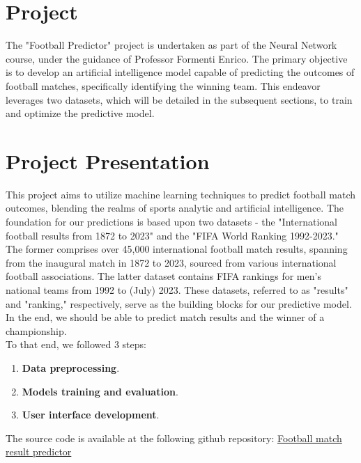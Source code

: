 \documentclass[a4paper,12pt]{article}
\begin{document}
\newpage
\maketitle
\tableofcontents

\newpage
\section{Project}

The "Football Predictor" project is undertaken as part of the Neural Network course, under the guidance of Professor Formenti Enrico. The primary objective is to develop an artificial intelligence model capable of predicting the outcomes of football matches, specifically identifying the winning team. This endeavor leverages two datasets, which will be detailed in the subsequent sections, to train and optimize the predictive model.

\section{Project Presentation}

This project aims to utilize machine learning techniques to predict football match outcomes, blending the realms of sports analytic and artificial intelligence. The foundation for our predictions is based upon two datasets - the "International football results from 1872 to 2023" and the "FIFA World Ranking 1992-2023." The former comprises over 45,000 international football match results, spanning from the inaugural match in 1872 to 2023, sourced from various international football associations. The latter dataset contains FIFA rankings for men's national teams from 1992 to (July) 2023. These datasets, referred to as "results" and "ranking," respectively, serve as the building blocks for our predictive model.\\

In the end, we should be able to predict match results and the winner of a championship.\\

To that end, we followed 3 steps:
\begin{enumerate}
    \item \textbf{Data preprocessing}.
    \item \textbf{Models training and evaluation}.
    \item \textbf{User interface development}.
\end{enumerate}

The source code is available at the following github repository: \href{https://github.com/H4znow/Football_match_results_predictor}{Football match result predictor}
\end{document}
